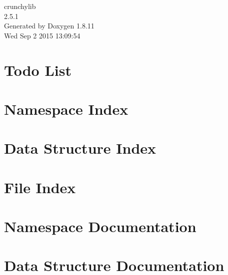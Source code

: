 \documentclass[twoside]{book}
\newcommand{\+}{\discretionary{\mbox{\scriptsize$\hookleftarrow$}}{}{}}
\newcommand{\clearemptydoublepage}{%
  \newpage{\pagestyle{empty}\cleardoublepage}%
}
\begin{document}
\hypersetup{pageanchor=false,
             bookmarks=true,
             bookmarksnumbered=true,
             pdfencoding=unicode
            }
\begin{titlepage}
\vspace*{7cm}
\begin{center}%
{\Large crunchylib \\[1ex]\large 2.\+5.\+1 }\\
\vspace*{1cm}
{\large Generated by Doxygen 1.8.11}\\
\vspace*{0.5cm}
{\small Wed Sep 2 2015 13:09:54}\\
\end{center}
\end{titlepage}
\clearemptydoublepage
\tableofcontents
\clearemptydoublepage
{}
\hypersetup{pageanchor=true}

\chapter{Todo List}
\label{todo}
\hypertarget{todo}{}

\chapter{Namespace Index}

\chapter{Data Structure Index}

\chapter{File Index}

\chapter{Namespace Documentation}







\chapter{Data Structure Documentation}


















\end{document}

